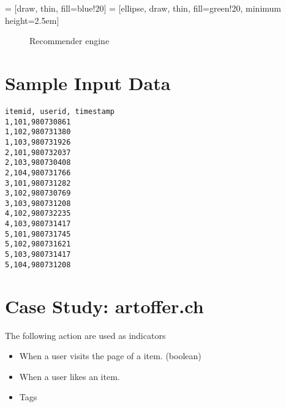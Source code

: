  = [draw, thin, fill=blue!20]
 = [ellipse, draw, thin, fill=green!20, minimum height=2.5em]
\begin{figure}
\centering
{}
\caption{Recommender engine}
\end{figure}

\section{Sample Input Data}
\label{sec:sampleinput}

\begin{lstlisting}[label=lst:sampledata]
itemid, userid, timestamp
1,101,980730861
1,102,980731380
1,103,980731926
2,101,980732037
2,103,980730408
2,104,980731766
3,101,980731282
3,102,980730769
3,103,980731208
4,102,980732235
4,103,980731417
5,101,980731745
5,102,980731621
5,103,980731417
5,104,980731208  
\end{lstlisting}

\section{Case Study: artoffer.ch}
\label{sec:artoffer}

The following action are used as indicators
\begin{itemize}
\item When a user visits the page of a item. (boolean)
\item When a user likes an item.
\item Tags
\end{itemize}
